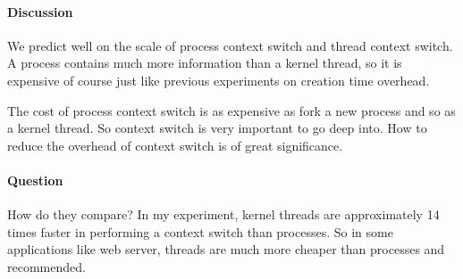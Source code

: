 \paragraph{Discussion}
We predict well on the scale of process context switch and thread context switch. A process contains much more information than a kernel thread, so it is expensive of course just like previous experiments on creation time overhead.

The cost of process context switch is as expensive as fork a new process and so as a kernel thread. So context switch is very important to go deep into. How to reduce the overhead of context switch is of great significance.

\paragraph{Question} How do they compare?
In my experiment, kernel threads are approximately 14 times faster in performing a context switch than processes. So in some applications like web server, threads are much more cheaper than processes and recommended.